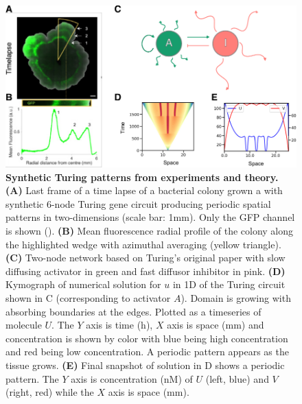 \begin{figure}[H]
    \includegraphics[width=1\textwidth]{figures/biological_example}

    \caption{{\bf Synthetic Turing patterns from experiments and theory.}
        \textbf{(A)} Last frame of a time lapse of a bacterial colony grown a with synthetic 6-node Turing gene circuit producing periodic spatial patterns in two-dimensions (scale bar: 1mm). Only the GFP channel is shown (\cite{Oliver2023}). \textbf{(B)} Mean fluorescence radial profile of the colony along the highlighted wedge with azimuthal averaging (yellow triangle). \textbf{(C)} Two-node network based on Turing’s original paper \cite{Turing1952} with slow diffusing activator in green and fast diffusor inhibitor in pink. \textbf{(D)} Kymograph of numerical solution for $u$ in 1D of the Turing circuit shown in C (corresponding to activator $A$). Domain is growing with absorbing boundaries at the edges. Plotted as a timeseries of molecule $U$. The $Y$ axis is time (h), $X$ axis is space (mm) and concentration is shown by color with blue being high concentration and red being low concentration. A periodic pattern appears as the tissue grows. \textbf{(E)} Final snapshot of solution in D shows a periodic pattern. The $Y$ axis is concentration (nM) of $U$ (left, blue) and $V$ (right, red) while the $X$ axis is space (mm). }
    \label{fig1}
\end{figure}
